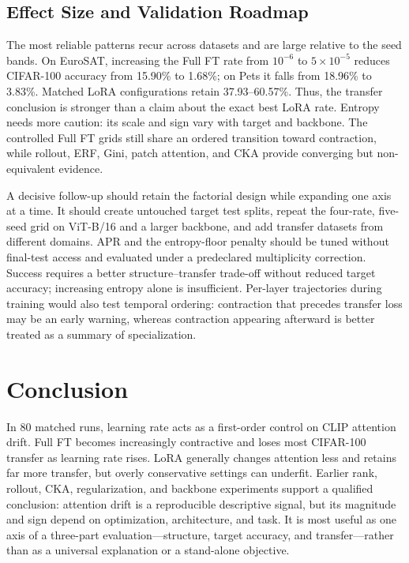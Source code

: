 \documentclass[conference]{IEEEtran}
\begin{document}
\subsection{Effect Size and Validation Roadmap}
The most reliable patterns recur across datasets and are large relative to the seed bands. On EuroSAT, increasing the Full FT rate from $10^{-6}$ to $5\times10^{-5}$ reduces CIFAR-100 accuracy from 15.90\% to 1.68\%; on Pets it falls from 18.96\% to 3.83\%. Matched LoRA configurations retain 37.93--60.57\%. Thus, the transfer conclusion is stronger than a claim about the exact best LoRA rate. Entropy needs more caution: its scale and sign vary with target and backbone. The controlled Full FT grids still share an ordered transition toward contraction, while rollout, ERF, Gini, patch attention, and CKA provide converging but non-equivalent evidence.

A decisive follow-up should retain the factorial design while expanding one axis at a time. It should create untouched target test splits, repeat the four-rate, five-seed grid on ViT-B/16 and a larger backbone, and add transfer datasets from different domains. APR and the entropy-floor penalty should be tuned without final-test access and evaluated under a predeclared multiplicity correction. Success requires a better structure--transfer trade-off without reduced target accuracy; increasing entropy alone is insufficient. Per-layer trajectories during training would also test temporal ordering: contraction that precedes transfer loss may be an early warning, whereas contraction appearing afterward is better treated as a summary of specialization.

\section{Conclusion}
In 80 matched runs, learning rate acts as a first-order control on CLIP attention drift. Full FT becomes increasingly contractive and loses most CIFAR-100 transfer as learning rate rises. LoRA generally changes attention less and retains far more transfer, but overly conservative settings can underfit. Earlier rank, rollout, CKA, regularization, and backbone experiments support a qualified conclusion: attention drift is a reproducible descriptive signal, but its magnitude and sign depend on optimization, architecture, and task. It is most useful as one axis of a three-part evaluation---structure, target accuracy, and transfer---rather than as a universal explanation or a stand-alone objective.

\FloatBarrier
\balance


\end{document}
